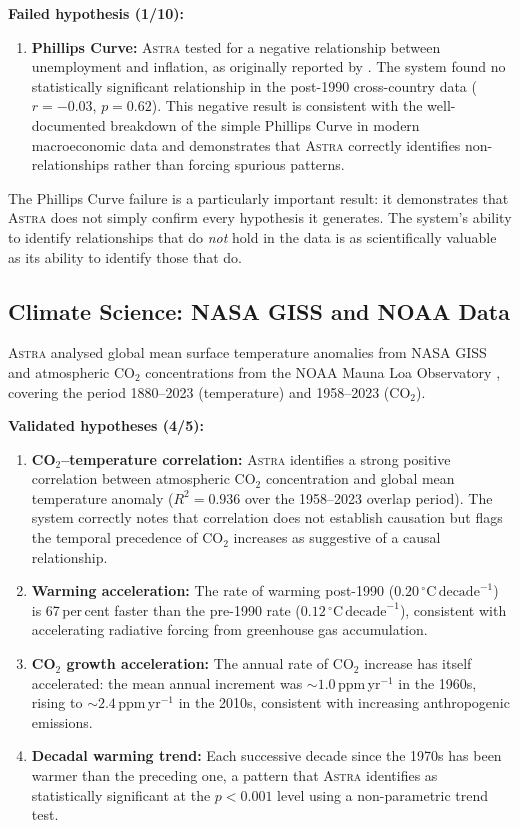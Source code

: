 \documentclass[usenatbib]{rasti}
\newcommand{\astra}{\textsc{Astra}\xspace}
\begin{document}
\textbf{Failed hypothesis (1/10):}
\begin{enumerate}
  \item[(x)] \textbf{Phillips Curve:} \astra tested for a negative relationship between unemployment and inflation, as originally reported by \citet{Phillips1958}. The system found no statistically significant relationship in the post-1990 cross-country data ($r = -0.03$, $p = 0.62$). This negative result is consistent with the well-documented breakdown of the simple Phillips Curve in modern macroeconomic data and demonstrates that \astra correctly identifies non-relationships rather than forcing spurious patterns.
\end{enumerate}

The Phillips Curve failure is a particularly important result: it demonstrates that \astra does not simply confirm every hypothesis it generates. The system's ability to identify relationships that do \emph{not} hold in the data is as scientifically valuable as its ability to identify those that do.

\subsection{Climate Science: NASA GISS and NOAA Data}
\label{sec:crossdomain:climate}

\astra analysed global mean surface temperature anomalies from NASA GISS \citep{Hansen2010} and atmospheric CO$_{2}$ concentrations from the NOAA Mauna Loa Observatory \citep{NOAA2024}, covering the period 1880--2023 (temperature) and 1958--2023 (CO$_{2}$).

\textbf{Validated hypotheses (4/5):}
\begin{enumerate}
  \item[(i)] \textbf{CO$_{2}$--temperature correlation:} \astra identifies a strong positive correlation between atmospheric CO$_{2}$ concentration and global mean temperature anomaly ($R^{2} = 0.936$ over the 1958--2023 overlap period). The system correctly notes that correlation does not establish causation but flags the temporal precedence of CO$_{2}$ increases as suggestive of a causal relationship.
  \item[(ii)] \textbf{Warming acceleration:} The rate of warming post-1990 ($0.20\,^{\circ}\mathrm{C}\,\mathrm{decade}^{-1}$) is 67\,per\,cent faster than the pre-1990 rate ($0.12\,^{\circ}\mathrm{C}\,\mathrm{decade}^{-1}$), consistent with accelerating radiative forcing from greenhouse gas accumulation.
  \item[(iii)] \textbf{CO$_{2}$ growth acceleration:} The annual rate of CO$_{2}$ increase has itself accelerated: the mean annual increment was ${\sim}1.0$\,ppm\,yr$^{-1}$ in the 1960s, rising to ${\sim}2.4$\,ppm\,yr$^{-1}$ in the 2010s, consistent with increasing anthropogenic emissions.
  \item[(iv)] \textbf{Decadal warming trend:} Each successive decade since the 1970s has been warmer than the preceding one, a pattern that \astra identifies as statistically significant at the $p < 0.001$ level using a non-parametric trend test.
\end{enumerate}
\end{document}
